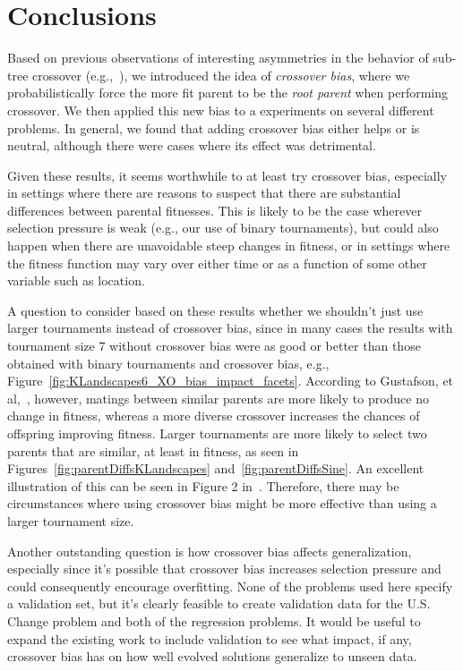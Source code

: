 \documentclass{sig-alternate}
\begin{document}
\section{Conclusions} \label{sec:Conclusions}

Based on previous observations of interesting asymmetries in the behavior of sub-tree crossover
(e.g.,~\cite{McPheeDonatucciDramdahl:2014}), we introduced the idea of \emph{crossover bias}, where we
probabilistically force the more fit parent to be the \emph{root parent} when performing crossover. We then applied
this new bias to a experiments on several different problems. In general, we found that adding crossover bias either
helps or is neutral, although there were cases where its effect was detrimental.

Given these results, it seems worthwhile to at least try crossover bias, especially in settings where there are reasons
to suspect that there are substantial differences between parental fitnesses. This is likely to be the case wherever
selection pressure is weak (e.g., our use of binary tournaments), but could also happen when there are unavoidable
steep changes in fitness, or in settings where the fitness function may vary over either time or as a function of some
other variable such as location.

A question to consider based on these results whether we shouldn't just use larger tournaments 
instead of crossover bias, since in many cases the results with tournament size 7 without crossover bias
were as good or better than those obtained with binary tournaments and crossover bias, 
e.g., Figure~\ref{fig:KLandscapes6_XO_bias_impact_facets}. 
According to Gustafson, et al,~\cite{Gustafson:2005}, however, matings between similar parents are more likely 
to produce no change in fitness, whereas a more diverse crossover increases the chances of offspring 
improving fitness. Larger tournaments are more likely to select two parents that are similar, at 
least in fitness, as seen in Figures~\ref{fig:parentDiffsKLandscapes} and~\ref{fig:parentDiffsSine}. 
An excellent illustration of this can be seen in Figure 2 in~\cite{Boetticher:2006}. Therefore, 
there may be circumstances where using crossover bias might be more effective than using 
a larger tournament size. 

Another outstanding question is how crossover bias affects generalization, especially since it's possible that crossover
bias increases selection pressure and could consequently encourage overfitting. None of the problems used here specify
a validation set, but it's clearly feasible to create validation data for the U.S. Change problem and both of the
regression problems. It would be useful to expand the existing work to include validation to see what impact, if any,
crossover bias has on how well evolved solutions generalize to unseen data.
\end{document}
